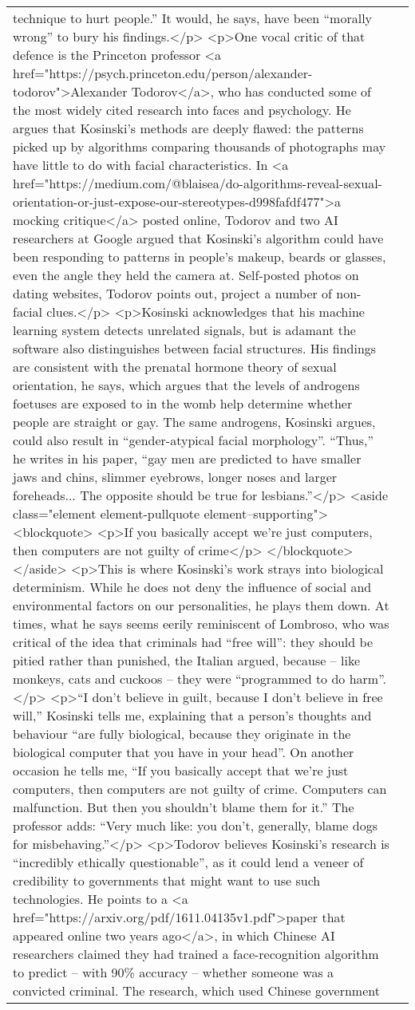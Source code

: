 \documentclass[]{article}
\begin{document}
\begin{table}[!h]
{\begin{tabular}[t]{ll}
technique to hurt people.” It would, he says, have been “morally wrong” to bury his findings.</p> <p>One vocal critic of that defence is the Princeton professor <a href="https://psych.princeton.edu/person/alexander-todorov">Alexander Todorov</a>, who has conducted some of the most widely cited research into faces and psychology. He argues that Kosinski’s methods are deeply flawed: the patterns picked up by algorithms comparing thousands of photographs may have little to do with facial characteristics. In <a href="https://medium.com/@blaisea/do-algorithms-reveal-sexual-orientation-or-just-expose-our-stereotypes-d998fafdf477">a mocking critique</a> posted online, Todorov and two AI researchers at Google argued that Kosinski’s algorithm could have been responding to patterns in people’s makeup, beards or glasses, even the angle they held the camera at. Self-posted photos on dating websites, Todorov points out, project a number of non-facial clues.</p> <p>Kosinski acknowledges that his machine learning system detects unrelated signals, but is adamant the software also distinguishes between facial structures. His findings are consistent with the prenatal hormone theory of sexual orientation, he says, which argues that the levels of androgens foetuses are exposed to in the womb help determine whether people are straight or gay. The same androgens, Kosinski argues, could also result in “gender-atypical facial morphology”. “Thus,” he writes in his paper, “gay men are predicted to have smaller jaws and chins, slimmer eyebrows, longer noses and larger foreheads... The opposite should be true for lesbians.”</p>  <aside class="element element-pullquote element--supporting"> <blockquote> <p>If you basically accept we’re just computers, then computers are not guilty of crime</p> </blockquote> </aside>  <p>This is where Kosinski’s work strays into biological determinism. While he does not deny the influence of social and environmental factors on our personalities, he plays them down. At times, what he says seems eerily reminiscent of Lombroso, who was critical of the idea that criminals had “free will”: they should be pitied rather than punished, the Italian argued, because – like monkeys, cats and cuckoos – they were “programmed to do harm”.</p> <p>“I don’t believe in guilt, because I don’t believe in free will,” Kosinski tells me, explaining that a person’s thoughts and behaviour “are fully biological, because they originate in the biological computer that you have in your head”. On another occasion he tells me, “If you basically accept that we’re just computers, then computers are not guilty of crime. Computers can malfunction. But then you shouldn’t blame them for it.” The professor adds: “Very much like: you don’t, generally, blame dogs for misbehaving.”</p> <p>Todorov believes Kosinski’s research is “incredibly ethically questionable”, as it could lend a veneer of credibility to governments that might want to use such technologies. He points to a <a href="https://arxiv.org/pdf/1611.04135v1.pdf">paper that appeared online two years ago</a>, in which Chinese AI researchers claimed they had trained a face-recognition algorithm to predict – with 90\% accuracy – whether someone was a convicted criminal. The research, which used Chinese government 
\end{tabular}}
\end{table}
\end{document}
